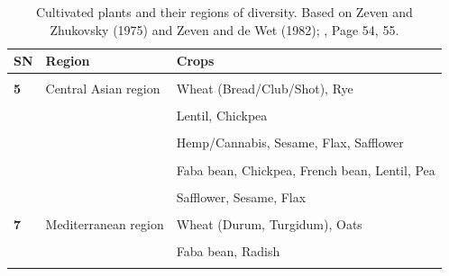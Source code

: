 \documentclass[
  ignorenonframetext,
  aspectratio=169]{beamer}
\begin{document}
\begin{frame}{}
\protect\hypertarget{section-13}{}
\begin{table}

\caption{\label{tab:diversity-region2}Cultivated plants and their regions of diversity. Based on Zeven and Zhukovsky (1975) and Zeven and de Wet (1982); \cite{hayward2012plant}, Page 54, 55.}
\centering
\fontsize{6}{8}\selectfont
\begin{tabular}[t]{>{\raggedright\arraybackslash}p{3em}>{\raggedright\arraybackslash}p{14em}>{\raggedright\arraybackslash}p{32em}}
\toprule
SN & Region & Crops\\
\midrule
\textbf{\cellcolor{gray!6}{}} & \cellcolor{gray!6}{} & \cellcolor{gray!6}{Sesame, Ginger, Turmeric, Cardamom, Arecanut, Sugarcane, Black pepper, Indigo}\\
\textbf{5} & Central Asian region & Wheat (Bread/Club/Shot), Rye\\
\textbf{\cellcolor{gray!6}{}} & \cellcolor{gray!6}{} & \cellcolor{gray!6}{Allium/Onion, Garlic, Spinach, Peas, Beetroot, Faba bean}\\
\textbf{} &  & Lentil, Chickpea\\
\textbf{\cellcolor{gray!6}{}} & \cellcolor{gray!6}{} & \cellcolor{gray!6}{Apricot, Plum, Pear, Apple, Walnut, Almond, Pistachio, Melon, Grape, Carrot, Radish}\\
\addlinespace
\textbf{} &  & Hemp/Cannabis, Sesame, Flax, Safflower\\
\textbf{\cellcolor{gray!6}{6}} & \cellcolor{gray!6}{Near Eastern region} & \cellcolor{gray!6}{Wheat (Einkorn, Durum, Poulard, Bread), Barley, Rye/Secale}\\
\textbf{} &  & Faba bean, Chickpea, French bean, Lentil, Pea\\
\textbf{\cellcolor{gray!6}{}} & \cellcolor{gray!6}{} & \cellcolor{gray!6}{Brassica oleracea, Allium, Melon, Grape, Plum, Pear, Apple, Apricot, Pistachio, Fig, Pomegranate, Almond}\\
\textbf{} &  & Safflower, Sesame, Flax\\
\addlinespace
\textbf{\cellcolor{gray!6}{}} & \cellcolor{gray!6}{} & \cellcolor{gray!6}{Lupins, Medics}\\
\textbf{7} & Mediterranean region & Wheat (Durum, Turgidum), Oats\\
\textbf{\cellcolor{gray!6}{}} & \cellcolor{gray!6}{} & \cellcolor{gray!6}{Brassica oleracea, Lettuce, Beetroot, Colza}\\
\textbf{} &  & Faba bean, Radish\\
\textbf{\cellcolor{gray!6}{}} & \cellcolor{gray!6}{} & \cellcolor{gray!6}{Olive, Trifolium/Berseem, Lupins, Crocus, Grape, Fennel, Cumin, Celery, Linseed}\\
\bottomrule
\end{tabular}
\end{table}
\end{frame}
\end{document}
